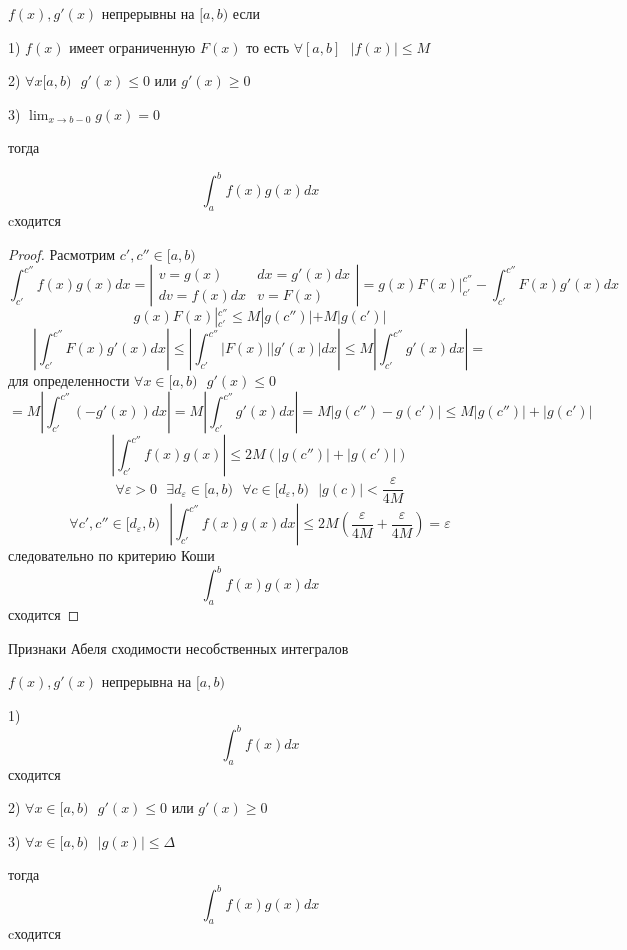 \begin{block}
  $f(x), g'(x)$ непрерывны на $[a,b)$ если

  1) $f(x)$ имеет ограниченную $F(x)$ то есть $\forall [a,b] ~~~ |f(x)| \le M$

  2) $\forall x[a,b) ~~~ g'(x) \le 0$ или $g'(x) \ge 0$

  3) $\lim_{x \to b-0} g(x) = 0$

  тогда

  $$\int_a^b f(x)g(x)dx$$ cходится
\end{block}

\begin{proof}
  Расмотрим $c',c'' \in [a,b)$
  $$
  \int_{c'}^{c''} f(x)g(x)dx =
  \left|
    \begin{array}{ll}
      v = g(x)    & dx = g'(x)dx \\
      dv = f(x)dx & v = F(x)
    \end{array}
  \right|
  = g(x)F(x)|_{c'}^{c''} - \int_{c'}^{c''} F(x)g'(x)dx
  $$
  $$
  g(x)F(x)|_{c'}^{c''} \le M |g(c'')| + M |g(c')|
  $$
  $$
  \left| \int_{c'}^{c''} F(x)g'(x)dx \right| \le
  \left| \int_{c'}^{c''} |F(x)||g'(x)|dx \right| \le
  M \left| \int_{c'}^{c''} g'(x)dx \right| =
  $$
  для определенности $\forall x \in [a,b) ~~~ g'(x) \le 0$
  $$
  = M \left| \int_{c'}^{c''} (-g'(x))dx \right| =
  M \left| \int_{c'}^{c''} g'(x)dx \right| =
  M|g(c'') - g(c')| \le
  M|g(c'')| + |g(c')|
  $$
  $$
  \left| \int_{c'}^{c''} f(x)g(x) \right| \le 2M(|g(c'')| + |g(c')|)
  $$
  $$
  \forall \varepsilon > 0 ~~~ \exists d_{\varepsilon} \in [a,b) ~~~
  \forall c \in [d_{\varepsilon}, b) ~~~ |g(c)| < \frac{\varepsilon}{4M}
  $$
  $$
  \forall c', c'' \in [d_{\varepsilon}, b) ~~~
  \left| \int_{c'}^{c''} f(x)g(x)dx \right| \le
  2M \left( \frac{\varepsilon}{4M} + \frac{\varepsilon}{4M}\right) = \varepsilon
  $$
  следовательно по критерию Коши
  $$
  \int_a^b f(x)g(x)dx
  $$
  сходится
\end{proof}

\begin{title}[\Large]
  Признаки Абеля сходимости несобственных интегралов
\end{title}

\begin{block}
  $f(x),g'(x)$ непрерывна на $[a,b)$

  1) $$\int_a^b f(x)dx$$ сходится

  2) $\forall x \in [a,b) ~~~ g'(x) \le 0$ или $g'(x) \ge 0$

  3) $\forall x \in [a,b) ~~~ |g(x)| \le \Delta$

  тогда
  $$
  \int_a^b f(x)g(x)dx
  $$
  cходится
\end{block}

